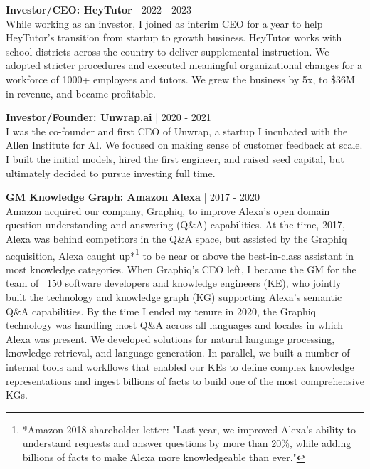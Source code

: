 \documentclass[a4paper,10pt]{article}
\begin{document}
\vspace{5pt} %

\noindent
\textbf{Investor/CEO: HeyTutor} | 2022 - 2023 \\
While working as an investor, I joined as interim CEO for a year to help HeyTutor's transition from startup to growth business. HeyTutor works with school districts across the country to deliver supplemental instruction. We adopted stricter procedures and executed meaningful organizational changes for a workforce of 1000+ employees and tutors. We grew the business by 5x, to \$36M in revenue, and became profitable.

\vspace{5pt} %

\noindent
\textbf{Investor/Founder: Unwrap.ai} | 2020 - 2021 \\
I was the co-founder and first CEO of Unwrap, a startup I incubated with the Allen Institute for AI. We focused on making sense of customer feedback at scale. I built the initial models, hired the first engineer, and raised seed capital, but ultimately decided to pursue investing full time.

\vspace{5pt} %

\noindent
\textbf{GM Knowledge Graph: Amazon Alexa} | 2017 - 2020 \\
Amazon acquired our company, Graphiq, to improve Alexa's open domain question understanding and answering (Q\&A) capabilities. At the time, 2017, Alexa was behind competitors in the Q\&A space, but assisted by the Graphiq acquisition, Alexa caught up*\footnote{*Amazon 2018 shareholder letter: "Last year, we improved Alexa's ability to understand requests and answer questions by more than 20\%, while adding billions of facts to make Alexa more knowledgeable than ever."}  to be near or above the best-in-class assistant in most knowledge categories. When Graphiq's CEO left, I became the GM for the team of ~150 software developers and knowledge engineers (KE), who jointly built the technology and knowledge graph (KG) supporting Alexa's semantic Q\&A capabilities. By the time I ended my tenure in 2020, the Graphiq technology was handling most Q\&A across all languages and locales in which Alexa was present. We developed solutions for natural language processing, knowledge retrieval, and language generation. In parallel, we built a number of internal tools and workflows that enabled our KEs to define complex knowledge representations and ingest billions of facts to build one of the most comprehensive KGs.
\end{document}
